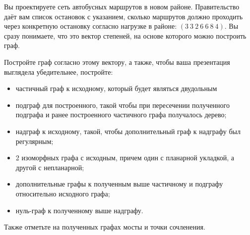 \question
Вы проектируете сеть автобусных маршрутов в новом районе. Правительство даёт вам список остановок с указанием, сколько маршрутов должно проходить через конкретную остановку согласно нагрузке в районе: $(3\ 3\ 2\ 6\ 6\ 8\ 4)$. Вы сразу понимаете, что это вектор степеней, на основе которого можно построить граф.

Постройте граф согласно этому вектору, а также, чтобы ваша презентация выглядела убедительнее, постройте:

\begin{itemize}
\item частичный граф к исходному, который будет являться двудольным
\item подграф для построенного, такой чтобы при пересечении полученного подграфа и ранее построенного частичного графа получалось дерево;
\item надграф к исходному, такой, чтобы дополнительный граф к надграфу был регулярным;
\item 2 изоморфных графа с исходным, причем один с планарной укладкой, а другой с непланарной;
\item дополнительные графы к полученным выше частичному и подграфу относительно исходного графа;
\item нуль-граф к полученному выше надграфу.
\end{itemize}

Также отметьте на полученных графах мосты и точки сочленения.
